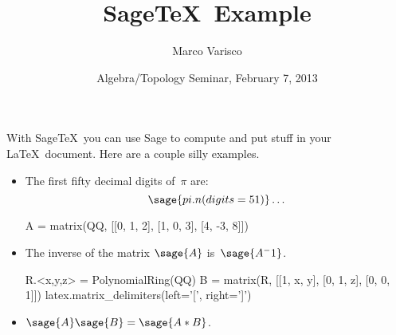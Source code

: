 \documentclass[12pt]{article}
\author{Marco Varisco}
\title{Sage\TeX\ Example}
\date{Algebra/Topology Seminar, February 7, 2013}
\begin{document}
\maketitle
\thispagestyle{empty}

With Sage\TeX\ you can use Sage to compute and put stuff in your \LaTeX\ document.
Here are a couple silly examples.

\begin{itemize}

\item The first fifty decimal digits of~$\pi$ are:
\[
    \sage{pi.n(digits=51)}\ldots
\]

\begin{sagesilent}
    A = matrix(QQ, [[0, 1, 2], [1, 0, 3], [4, -3, 8]])
\end{sagesilent}
\item The inverse of the matrix $\sage{A}$ is~$\sage{A^-1}$.

\begin{sagesilent}
    R.<x,y,z> = PolynomialRing(QQ)
    B = matrix(R, [[1, x, y], [0, 1, z], [0, 0, 1]])
    latex.matrix_delimiters(left='[', right=']')
\end{sagesilent}
\item $\sage{A}\sage{B}=\sage{A*B}$.

\end{itemize}
\end{document}
